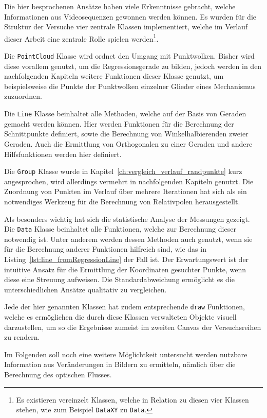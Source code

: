 Die hier besprochenen Ansätze haben viele Erkenntnisse gebracht, welche Informationen aus Videosequenzen gewonnen werden können.
Es wurden für die Struktur der Versuche vier zentrale Klassen implementiert, welche im Verlauf dieser Arbeit eine zentrale Rolle spielen werden\footnote{Es existieren vereinzelt Klassen, welche in Relation zu diesen vier Klassen stehen, wie zum Beispiel \lstinline{DataXY} zu \lstinline{Data}.}.

Die \lstinline{PointCloud} Klasse wird ordnet den Umgang mit Punktwolken.
Bisher wird diese vorallem genutzt, um die Regressionsgerade zu bilden, jedoch werden in den nachfolgenden Kapiteln weitere Funktionen dieser Klasse genutzt, um beispielsweise die Punkte der Punktwolken einzelner Glieder eines Mechanismus zuzuordnen.

Die \lstinline{Line} Klasse beinhaltet alle Methoden, welche auf der Basis von Geraden gemacht werden können.
Hier werden Funktionen für die Berechnung der Schnittpunkte definiert, sowie die Berechnung von Winkelhalbierenden zweier Geraden.
Auch die Ermittlung von Orthogonalen zu einer Geraden und andere Hilfsfunktionen werden hier definiert.

Die \lstinline{Group} Klasse wurde in Kapitel~\ref{ch:vergleich_verlauf_randpunkte} kurz angesprochen, wird allerdings vermehrt in nachfolgenden Kapiteln genutzt.
Die Zuordnung von Punkten im Verlauf über mehrere Iterationen hat sich als ein notwendiges Werkzeug für die Berechnung von Relativpolen herausgestellt.

Als besonders wichtig hat sich die statistische Analyse der Messungen gezeigt.
Die \lstinline{Data} Klasse beinhaltet alle Funktionen, welche zur Berechnung dieser notwendig ist.
Unter anderem werden dessen Methoden auch genutzt, wenn sie für die Berechnung anderer Funktionen hilfreich sind, wie das in Listing~\ref{lst:line_fromRegressionLine} der Fall ist.
Der Erwartungswert ist der intuitive Ansatz für die Ermittlung der Koordinaten gesuchter Punkte, wenn diese eine Streuung aufweisen.
Die Standardabweichung ermöglicht es die unterschiedlichen Ansätze qualitativ zu vergleichen.

Jede der hier genannten Klassen hat zudem entsprechende \lstinline{draw} Funktionen, welche es ermöglichen die durch diese Klassen verwalteten Objekte visuell darzustellen, um so die Ergebnisse zumeist im zweiten Canvas der Versuchsreihen zu rendern.

Im Folgenden soll noch eine weitere Möglichtkeit untersucht werden nutzbare Information aus Veränderungen in Bildern zu ermitteln, nämlich über die Berechnung des optischen Flusses.
